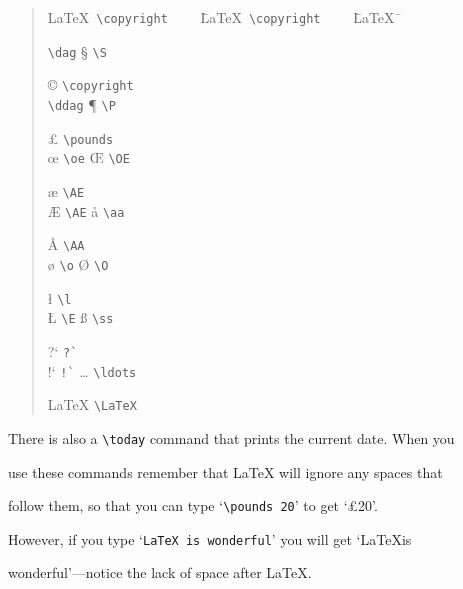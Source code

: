 \begin{quote}\begin{tabbing}



\LaTeX~\= \verb|\copyright|~~~~ \= \LaTeX~\= \verb|\copyright|~~~~ \=

\LaTeX~\=  \kill



\dag       \> \verb|\dag|       \> \S     \> \verb|\S|     \>

\copyright \> \verb|\copyright| \\

\ddag      \> \verb|\ddag|      \> \P     \> \verb|\P|     \>

\pounds    \> \verb|\pounds|    \\

\oe        \> \verb|\oe|        \> \OE    \> \verb|\OE|    \>

\ae        \> \verb|\AE|        \\

\AE        \> \verb|\AE|        \> \aa    \> \verb|\aa|    \>

\AA        \> \verb|\AA|        \\

\o         \> \verb|\o|         \> \O     \> \verb|\O|     \>

\l         \> \verb|\l|         \\

\L         \> \verb|\E|         \> \ss    \> \verb|\ss|    \>

?`         \> \verb|?`|         \\

!`         \> \verb|!`|         \> \ldots \> \verb|\ldots| \>

\LaTeX     \> \verb|\LaTeX|     \\

\end{tabbing}\end{quote}

There is also a \verb|\today| command that prints the current date. When you

use these commands remember that \LaTeX{} will ignore any spaces that

follow them, so that you can type `\verb|\pounds 20|' to get `\pounds 20'.

However, if you type `\verb|LaTeX is wonderful|' you will get `\LaTeX is

wonderful'---notice the lack of space after \LaTeX.

